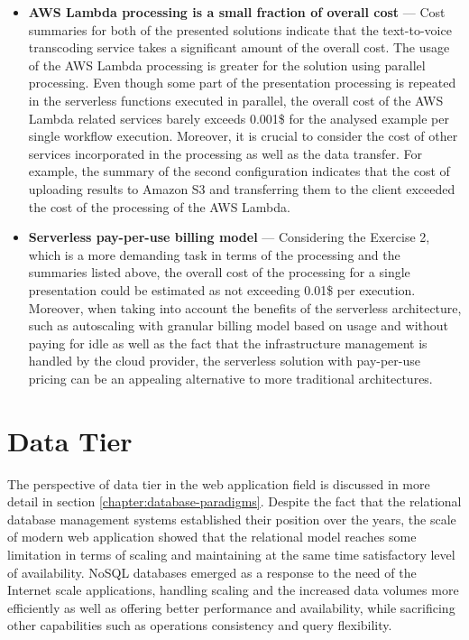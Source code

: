 \begin{itemize}
   \item \textbf{AWS Lambda processing is a small fraction of overall cost} --- Cost summaries for both of the presented solutions indicate that the text-to-voice transcoding service takes a significant amount of the overall cost.
   The usage of the AWS Lambda processing is greater for the solution using parallel processing.
   Even though some part of the presentation processing is repeated in the serverless functions executed in parallel, the overall cost of the AWS Lambda related services barely exceeds 0.001\$ for the analysed example per single workflow execution.
   Moreover, it is crucial to consider the cost of other services incorporated in the processing as well as the data transfer.
   For example, the summary of the second configuration indicates that the cost of uploading results to Amazon S3 and transferring them to the client exceeded the cost of the processing of the AWS Lambda.
   \item \textbf{Serverless pay-per-use billing model} --- Considering the Exercise 2, which is a more demanding task in terms of the processing and the summaries listed above, the overall cost of the processing for a single presentation could be estimated as not exceeding 0.01\$ per execution.
   Moreover, when taking into account the benefits of the serverless architecture, such as autoscaling with granular billing model based on usage and without paying for idle as well as the fact that the infrastructure management is handled by the cloud provider, the serverless solution with pay-per-use pricing can be an appealing alternative to more traditional architectures.
\end{itemize}

\section{Data Tier} \label{chapter:serverless-datastores}

The perspective of data tier in the web application field is discussed in more detail in section \ref{chapter:database-paradigms}.
Despite the fact that the relational database management systems established their position over the years, the scale of modern web application showed that the relational model reaches some limitation in terms of scaling and maintaining at the same time satisfactory level of availability.
NoSQL databases emerged as a response to the need of the Internet scale applications, handling scaling and the increased data volumes more efficiently as well as offering better performance and availability, while sacrificing other capabilities such as operations consistency and query flexibility.

